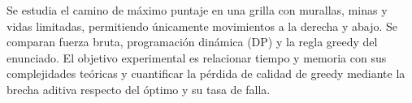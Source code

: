 Se estudia el camino de máximo puntaje en una grilla con murallas, minas y
vidas limitadas, permitiendo únicamente movimientos a la derecha y abajo.
Se comparan fuerza bruta, programación dinámica (DP) y la regla greedy del
enunciado. El objetivo experimental es relacionar tiempo y
memoria con sus complejidades teóricas y cuantificar la pérdida de calidad de
greedy mediante la brecha aditiva respecto del óptimo y su tasa de falla.
